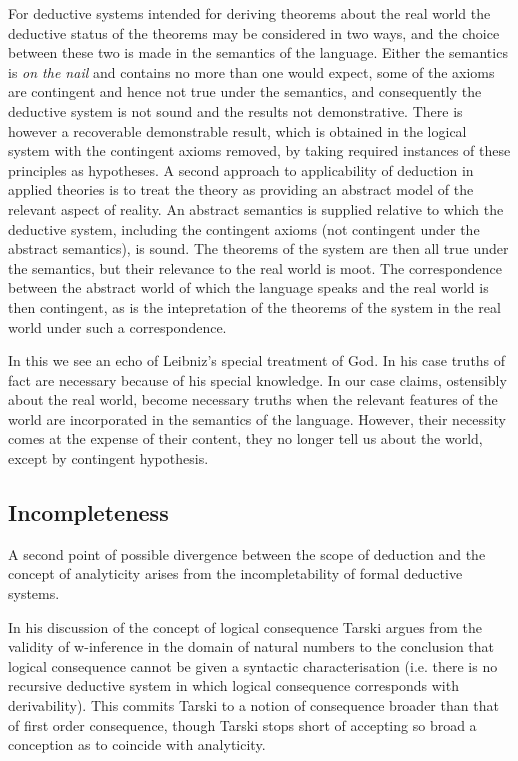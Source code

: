 \documentclass{rbjk}
\begin{document}
\begin{article}
For deductive systems intended for deriving theorems about the real world the deductive status of the theorems may be considered in two ways, and the choice between these two is made in the semantics of the language.
Either the semantics is {\it on the nail} and contains no more than one would expect, some of the axioms are contingent and hence not true under the semantics, and consequently the deductive system is not sound and the results not demonstrative.
There is however a recoverable demonstrable result, which is obtained in the logical system with the contingent axioms removed, by taking required instances of these principles as hypotheses.
A second approach to applicability of deduction in applied theories is to treat the theory as providing an abstract model of the relevant aspect of reality.
An abstract semantics is supplied relative to which the deductive system, including the contingent axioms (not contingent under the abstract semantics), is sound.
The theorems of the system are then all true under the semantics, but their relevance to the real world is moot.
The correspondence between the abstract world of which the language speaks and the real world is then contingent, as is the intepretation of the theorems of the system in the real world under such a correspondence.

In this we see an echo of Leibniz's special treatment of God.
In his case truths of fact are necessary because of his special knowledge.
In our case claims, ostensibly about the real world, become necessary truths when the relevant features of the world are incorporated in the semantics of the language.
However, their necessity comes at the expense of their content, they no longer tell us about the world, except by contingent hypothesis.

\subsection{Incompleteness}

A second point of possible divergence between the scope of deduction and the concept of analyticity arises from the incompletability of formal deductive systems.

In his discussion of the concept of logical consequence \cite{Tarski36} Tarski argues from the validity of w-inference in the domain of natural numbers to the conclusion that logical consequence cannot be given a syntactic characterisation (i.e. there is no recursive deductive system in which logical consequence corresponds with derivability).
This commits Tarski to a notion of consequence broader than that of first order consequence, though Tarski stops short of accepting so broad a conception as to coincide with analyticity.


\end{article}
\end{document}
